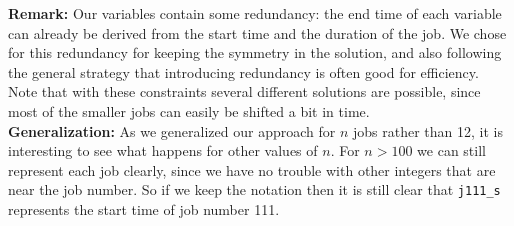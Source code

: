 \documentclass[a4paper]{article}
\begin{document}
{\bf Remark:}
Our variables contain some redundancy: the end time of each variable can already be derived from the start time and the duration of the job. We chose for this redundancy for keeping the symmetry in the solution, and also following the general strategy that introducing redundancy is often good for efficiency.\\

Note that with these constraints several different solutions are possible, since most of the smaller jobs can easily be shifted a bit in time.\\

{\bf Generalization:} 
As we generalized our approach for $n$ jobs rather than 12, it is interesting to see what happens for other values of $n$. For $n > 100$ we can still represent each job clearly, since we have no trouble with other integers that are near the job number. So if we keep the notation then it is still clear that {\tt j111\_s} represents the start time of job number 111.
\end{document}

